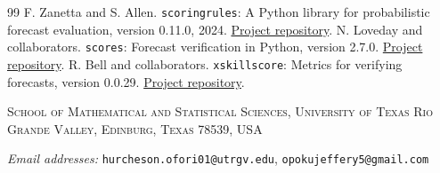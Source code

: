 \documentclass[11pt]{article}
\begin{document}
\begin{thebibliography}{99}
 F. Zanetta and S. Allen. \texttt{scoringrules}: A Python library for probabilistic forecast evaluation, version 0.11.0, 2024. \href{https://github.com/frazane/scoringrules}{Project repository}.
 N. Loveday and collaborators. \texttt{scores}: Forecast verification in Python, version 2.7.0. \href{https://github.com/nci/scores}{Project repository}.
 R. Bell and collaborators. \texttt{xskillscore}: Metrics for verifying forecasts, version 0.0.29. \href{https://github.com/xarray-contrib/xskillscore}{Project repository}.
\end{thebibliography}

\medskip
\noindent\textsc{School of Mathematical and Statistical Sciences,
University of Texas Rio Grande Valley, Edinburg, Texas 78539, USA}

\noindent\emph{Email addresses:}
\texttt{hurcheson.ofori01@utrgv.edu},
\texttt{opokujeffery5@gmail.com}
\end{document}
